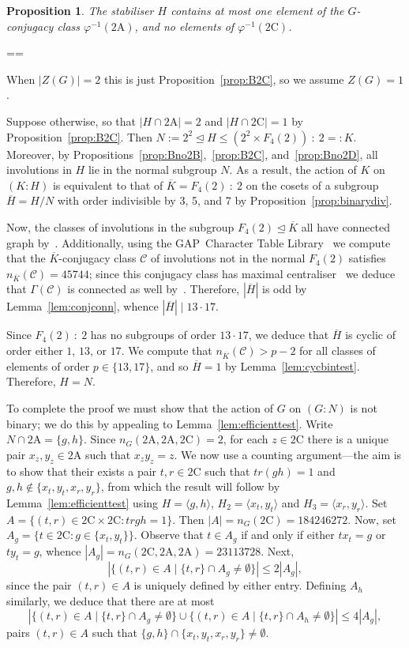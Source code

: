 \documentclass[11pt, a4paper]{amsart}
\makeatletter
\newcommand{\gap}{{\sf GAP}}
\def\cn{\mathord{{\!\:{:}\:\!}}}
\newtheorem{prop}[thm]{Proposition}
\renewcommand{\proofname}{Proof}
\renewenvironment{proof}[1][\proofname]{\par
  \pushQED{\qed}  \normalfont \partopsep=\z@skip \topsep=\z@skip
  \trivlist
  \item[\hskip\labelsep
        \scshape
    #1\@addpunct{.}]\ignorespaces
}{  \popQED\endtrivlist\@endpefalse
}
\makeatother
\begin{document}
\begin{prop}
    The stabiliser $H$ contains at most one element of the $G$-conjugacy class $\varphi^{-1}(\mathrm{2A})$, and no elements of  $\varphi^{-1}(\mathrm{2C})$.
\end{prop}
\begin{proof}
    When $|Z(G)|=2$ this is just Proposition~\ref{prop:B2C}, so we assume $Z(G)=1$.
    
    Suppose otherwise, so that $|H\cap\mathrm{2A}|=2$ and $|H\cap\mathrm{2C}|=1$ by Proposition~\ref{prop:B2C}. Then $N:=2^2\trianglelefteq H\leq(2^2\times F_4(2))\cn2=:K$. Moreover, by Propositions~\ref{prop:Bno2B},~\ref{prop:B2C}, and~\ref{prop:Bno2D}, all involutions in $H$ lie in the normal subgroup $N$. As a result, the action of $K$ on $(K:H)$ is equivalent to that of $\overline{K}=F_4(2)\cn2$ on the cosets of a subgroup $\overline{H}=H/N$ with order indivisible by 3, 5, and 7 by Proposition~\ref{prop:binarydiv}. 

Now, the classes of involutions in the subgroup $F_4(2)\trianglelefteq \overline{K}$ all have connected graph by~\cite[Theorem 2]{GGL25}. Additionally, using the \gap~Character Table Library~\cite{CTblLib1.3.11} we compute that the $\overline{K}$-conjugacy class $\mathcal{C}$ of involutions not in the normal $F_4(2)$ satisfies $n_{\overline{K}}(\mathcal{C})=45744$; since this conjugacy class has maximal centraliser~\cite{atlas} we deduce that $\Gamma(\mathcal{C})$ is connected as well by~\cite[Lemma 2.14]{CDP}. Therefore, $|\overline{H}|$ is odd by Lemma~\ref{lem:conjconn}, whence $|\overline{H}|\mid 13\cdot17$.

    Since $F_4(2)\cn2$ has no subgroups of order $13\cdot 17$, we deduce that $\overline{H}$ is cyclic of order either $1$, $13$, or $17$. We compute that $n_{\overline{K}}(\mathcal{C})>p-2$ for all classes of elements of order $p\in\{13,17\}$, and so $\overline{H}=1$ by Lemma~\ref{lem:cycbintest}. Therefore, $H=N$.

    To complete the proof we must show that the action of $G$ on $(G:N)$ is not binary; we do this by appealing to Lemma~\ref{lem:efficienttest}. Write $N\cap\mathrm{2A}=\{g,h\}$. Since $n_G(\mathrm{2A},\mathrm{2A},\mathrm{2C})=2$, for each $z\in\mathrm{2C}$ there is a unique pair $x_z,y_z\in\mathrm{2A}$ such that $x_zy_z=z$. We now use a counting argument---the aim is to show that their exists a pair $t,r\in\mathrm{2C}$ such that $tr(gh)=1$ and $g,h\not\in\{x_t,y_t,x_r,y_r\}$, from which the result will follow by Lemma~\ref{lem:efficienttest} using $H=\langle g,h\rangle$, $H_2=\langle x_t,y_t\rangle$ and $H_3=\langle x_r,y_r\rangle$. Set $A=\{(t,r)\in\mathrm{2C}\times\mathrm{2C} : trgh=1\}$. Then $|A|=n_G(\mathrm{2C})=184246272$. Now, set $A_g=\{t\in \mathrm{2C} : g\in\{x_t,y_t\}\}$. Observe that $t\in A_g$ if and only if either $tx_t=g$ or $ty_t=g$, whence $|A_g|=n_G(\mathrm{2C,2A,2A})=23113728$. Next, $$|\{(t,r)\in A \mid \{t,r\}\cap A_g\ne\emptyset\}|\leq 2|A_g|,$$ since the pair $(t,r)\in A$ is uniquely defined by either entry. Defining $A_h$ similarly, we deduce that there are at most $$|\{(t,r)\in A \mid \{t,r\}\cap A_g\ne\emptyset\}\cup\{(t,r)\in A \mid \{t,r\}\cap A_h\ne\emptyset\}|\leq 4|A_g|,$$ pairs $(t,r)\in A$ such that $\{g,h\}\cap \{x_t,y_t,x_r,y_r\}\ne\emptyset$.



\end{proof}
\end{document}
